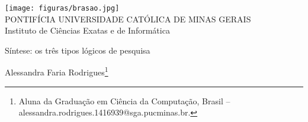\documentclass[a4paper,12pt,Times]{article}
\makeatletter
\newcommand{\monog}{Síntese: os três tipos lógicos de pesquisa}
\newcommand{\origem}{Brasil }
\newcommand{\AutorA}{Alessandra Faria Rodrigues}
\newcommand{\funcaoA}{}
\newcommand{\emailA}{alessandra.rodrigues.1416939@sga.pucminas.br}
\newcommand{\cursA}{Aluna da Graduação em Ciência da Computação}
\newcommand{\keyword}[1]{\textsf{#1}}
\makeatother
\begin{document}

\begin{center}
\texttt{[image: figuras/brasao.jpg]} \\
PONTIFÍCIA UNIVERSIDADE CATÓLICA DE MINAS GERAIS \\
Instituto de Ciências Exatas e de Informática


\end{center}

 \vspace{0cm} {
 \singlespacing \Large{\monog \symbolfootnote[1]{} \\ }
 }

\vspace{1.0cm}

\begin{flushright}
\singlespacing 
\normalsize{\AutorA \footnote{\funcaoA \cursA, \origem -- \emailA . }} \\
\end{flushright}
\thispagestyle{empty}

\vspace{1.0cm}

\begin{abstract}
\noindent
Esta síntese abordará os tipos lógicos de pesquisa, sendo eles: pesquisa sem hipótese (descritiva), pesquisa com hipótese com relação de associação e pesquisa com hipótese com relação de interferência. Apontando as características e peculiaridades de cada tipo, e ressaltando a importância de cada tipo de pesquisa. Esta síntese é baseada no vídeo de título “três tipos lógicos de pesquisa” do Dr. Gilson Luiz Volpato, que está disponível para visualização no YouTube.
\\\textbf{\keyword{Palavras-chave: }} pesquisa científica; hipótese.

\end{abstract}
\end{document}
